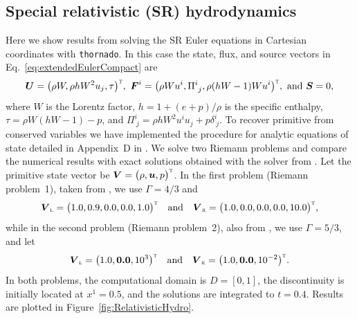 \documentclass[letterpaper]{jpconf}
\newcommand{\vect}[1]{\boldsymbol{#1}}
\newcommand{\trans}{\textnormal{\tiny\textsc{T}}}
\newcommand{\leftState}{\textnormal{\tiny\textsc{L}}}
\newcommand{\rightState}{\textnormal{\tiny\textsc{R}}}
\newcommand{\thornado}{\texttt{thornado}}
\begin{document}
\subsection{Special relativistic (SR) hydrodynamics}

Here we show results from solving the SR Euler equations in Cartesian coordinates with \thornado.
In this case the state, flux, and source vectors in Eq.~\eqref{eq:extendedEulerCompact} are
\begin{equation}
  \vect{U}=\big(\rho W, \rho h W^{2} u_{j},\tau\big)^{\trans},~
  \vect{F}^{i}=\big(\rho W u^{i},\Pi^{i}_{~j},\rho(hW-1)W u^{i}\big)^{\trans},~
  \text{and}~\vect{S}=0,
\end{equation}
where $W$ is the Lorentz factor, $h=1+(e+p)/\rho$ is the specific enthalpy, $\tau=\rho W(hW-1)-p$, and $\Pi^{i}_{~j}=\rho h W^{2} u^{i} u_{j}+p\delta^{i}_{~j}$.  
To recover primitive from conserved variables we have implemented the procedure for analytic equations of state detailed in Appendix~D in \cite{rezzollaZanotti_2013}.  
We solve two Riemann problems and compare the numerical results with exact solutions obtained with the solver from \cite{martiMuller_2003}.  
Let the primitive state vector be $\vect{V}=\big(\rho,\vect{u},p\big)^{\trans}$.  
In the first problem (Riemann problem~1), taken from \cite{mignoneBodo_2005}, we use $\Gamma=4/3$ and
\begin{equation*}
  \vect{V}_{\leftState}=\big(1.0,0.9,0.0,0.0,1.0\big)^{\trans}\quad\text{and}\quad
  \vect{V}_{\rightState}=\big(1.0,0.0,0.0,0.0,10.0\big)^{\trans},
\end{equation*}
while in the second problem (Riemann problem~2), also from \cite{mignoneBodo_2005}, we use $\Gamma=5/3$, and let
\begin{equation*}
  \vect{V}_{\leftState}=\big(1.0,\vect{0.0},10^{3}\big)^{\trans}\quad\text{and}\quad
  \vect{V}_{\rightState}=\big(1.0,\vect{0.0},10^{-2}\big)^{\trans}.  
\end{equation*}
In both problems, the computational domain is $D=[0,1]$, the discontinuity is initially located at $x^{1}=0.5$, and the solutions are integrated to $t=0.4$.  
Results are plotted in Figure~\ref{fig:RelativisticHydro}.  
\end{document}

